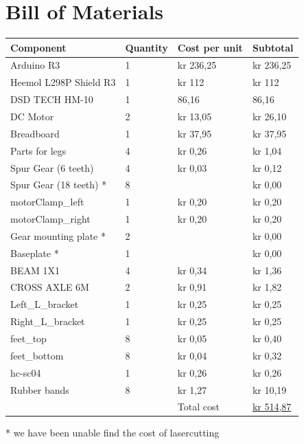 \section{Bill of Materials}
\begin{table}[!ht]
    \centering
    \begin{tabular}{|l|l|l|l|}
    \hline
        Component & Quantity & Cost per unit & Subtotal \\ \hline
        Arduino R3 & 1 & kr 236,25 & kr 236,25 \\ \hline
        Heemol L298P Shield R3  & 1 & kr 112 & kr 112 \\\hline
        DSD TECH HM-10 & 1 & 86,16 & 86,16  \\\hline
        DC Motor & 2 & kr 13,05 & kr 26,10 \\ \hline
        Breadboard & 1 & kr 37,95 & kr 37,95 \\ \hline
        Parts for legs & 4 & kr 0,26 & kr 1,04 \\ \hline
        Spur Gear (6 teeth) & 4 & kr 0,03 & kr 0,12 \\ \hline
        Spur Gear (18 teeth) * & 8 & ~ & kr 0,00 \\ \hline
        motorClamp\_left & 1 & kr 0,20 & kr 0,20 \\ \hline
        motorClamp\_right & 1 & kr 0,20 & kr 0,20 \\ \hline
        Gear mounting plate * & 2 & ~ & kr 0,00 \\ \hline
        Baseplate * & 1 & ~ & kr 0,00 \\ \hline
        BEAM 1X1 & 4 & kr 0,34 & kr 1,36 \\ \hline
        CROSS AXLE 6M & 2 & kr 0,91 & kr 1,82 \\ \hline
        Left\_L\_bracket & 1 & kr 0,25 & kr 0,25 \\ \hline
        Right\_L\_bracket & 1 & kr 0,25 & kr 0,25 \\ \hline
        feet\_top & 8 & kr 0,05 & kr 0,40 \\ \hline
        feet\_bottom & 8 & kr 0,04 & kr 0,32 \\ \hline
        hc-sc04  & 1 & kr 0,26 & kr 0,26 \\ \hline
        Rubber bands & 8 & kr 1,27 & kr 10,19 \\ \hline
         &  & Total cost & \underline{kr 514,87}\\ \hline
    \end{tabular}
\end{table}
* we have been unable find the cost of lasercutting

